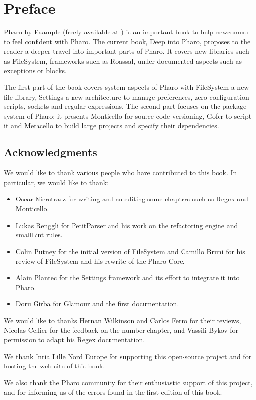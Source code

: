 \documentclass[a4paper,10pt,twoside]{book}
\begin{document}
	\sloppy
	\frontmatter
\fi
\chapter{Preface}

Pharo by Example (freely available at ) is an important book to help newcomers to feel confident with Pharo. 
The current book, Deep into Pharo, proposes to the reader a deeper travel into important parts of Pharo. It covers new libraries such as FileSystem, frameworks such as Roassal, under documented aspects such as exceptions or blocks. 

The first part of the book covers system aspects of Pharo with FileSystem a new file library, Settings a new architecture to manage preferences, zero configuration scripts, sockets and regular expressions. The second part focuses on the package system of Pharo: it presents Monticello for source code versioning, Gofer to script it and Metacello to build large projects and specify their dependencies. 

\section*{Acknowledgments}

We would like to thank various people who have contributed to this book. In particular, we would like to thank:
\begin{itemize}
\item Oscar Nierstrasz for writing and co-editing some chapters such as Regex and Monticello.
\item Lukas Renggli for PetitParser and his work on the refactoring engine and smallLint rules. 
\item Colin Putney for the initial version of FileSystem and Camillo Bruni for his review of FileSystem and his rewrite of the Pharo Core.
\item Alain Plantec for the Settings framework and its effort to integrate it into Pharo. 
\item Doru Girba for Glamour and the first documentation.
\end{itemize}

We would like to thanks Hernan Wilkinson and Carlos Ferro for their reviews, Nicolas Cellier for the feedback on the number chapter, and Vassili Bykov for permission to adapt his Regex documentation.

We thank Inria Lille Nord Europe for supporting this open-source project and for hosting the web site of this book.

We also thank the Pharo community for their enthusiastic support of this project, and for informing us of the errors found in the first edition of this book.



\ifx\wholebook\relax\else
   
   
\end{document}

